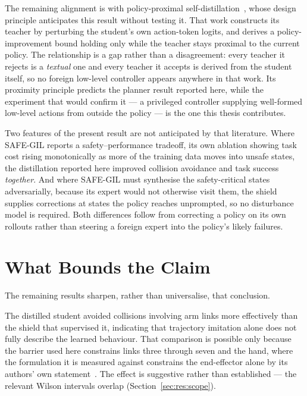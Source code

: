The remaining alignment is with policy-proximal self-distillation~\cite{wang2026roadvla}, whose
design principle anticipates this result without testing it. That work constructs its teacher by
perturbing the student's own action-token logits, and derives a policy-improvement bound holding
only while the teacher stays proximal to the current policy. The relationship is a gap rather than
a disagreement: every teacher it rejects is a \emph{textual} one and every teacher it accepts is
derived from the student itself, so no foreign low-level controller appears anywhere in that work.
Its proximity principle predicts the planner result reported here, while the experiment that would
confirm it --- a privileged controller supplying well-formed low-level actions from outside the
policy --- is the one this thesis contributes.

Two features of the present result are not anticipated by that literature. Where SAFE-GIL reports a
safety--performance tradeoff, its own ablation showing task cost rising monotonically as more of
the training data moves into unsafe states, the distillation reported here improved collision
avoidance and task success \emph{together}. And where SAFE-GIL must synthesise the safety-critical
states adversarially, because its expert would not otherwise visit them, the shield supplies
corrections at states the policy reaches unprompted, so no disturbance model is required. Both
differences follow from correcting a policy on its own rollouts rather than steering a foreign
expert into the policy's likely failures.

\section*{What Bounds the Claim}

The remaining results sharpen, rather than universalise, that conclusion.

The distilled student avoided collisions involving arm links more effectively than the shield that
supervised it, indicating that trajectory imitation alone does not fully describe the learned
behaviour. That comparison is possible only because the barrier used here constrains links three
through seven and the hand, where the formulation it is measured against constrains the
end-effector alone by its authors' own statement~\cite{vlsa2026}. The effect is suggestive rather
than established --- the relevant Wilson intervals overlap (Section~\ref{sec:res:scope}).

